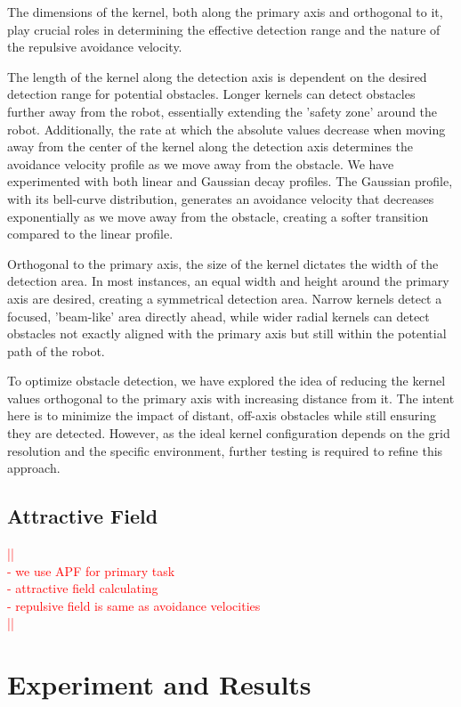 \documentclass[a4paper]{article}
\newcommand\todocomment[1]{\textcolor{red}{||\\ #1\\||}}
\begin{document}
The dimensions of the kernel, both along the primary axis and orthogonal to it, play crucial roles in determining the effective detection range and the nature of the repulsive avoidance velocity.

The length of the kernel along the detection axis is dependent on the desired detection range for potential obstacles. Longer kernels can detect obstacles further away from the robot, essentially extending the 'safety zone' around the robot. Additionally, the rate at which the absolute values decrease when moving away from the center of the kernel along the detection axis determines the avoidance velocity profile as we move away from the obstacle. We have experimented with both linear and Gaussian decay profiles. The Gaussian profile, with its bell-curve distribution, generates an avoidance velocity that decreases exponentially as we move away from the obstacle, creating a softer transition compared to the linear profile.

Orthogonal to the primary axis, the size of the kernel dictates the width of the detection area. In most instances, an equal width and height around the primary axis are desired, creating a symmetrical detection area. Narrow kernels detect a focused, 'beam-like' area directly ahead, while wider radial kernels can detect obstacles not exactly aligned with the primary axis but still within the potential path of the robot.

To optimize obstacle detection, we have explored the idea of reducing the kernel values orthogonal to the primary axis with increasing distance from it. The intent here is to minimize the impact of distant, off-axis obstacles while still ensuring they are detected. However, as the ideal kernel configuration depends on the grid resolution and the specific environment, further testing is required to refine this approach.
		 
\subsection{Attractive Field}

\todocomment{- we use APF for primary task\\
			 - attractive field calculating \\
		 	 - repulsive field is same as avoidance velocities}



\section{Experiment and Results}
\end{document}
